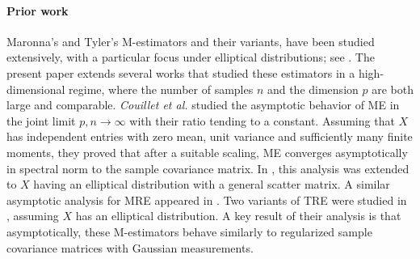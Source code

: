 \documentclass[times,sort&compress,3p]{elsarticle}
\begin{document}
\paragraph{Prior work}
Maronna's and Tyler's M-estimators and their variants, have been studied extensively, 
with a particular focus under elliptical distributions; see  \cite{wiesel2012geodesic,soloveychik2015performance,abramovich,ollila2014regularized,chen,pascal,wiesel2015structured,couillet2014robust,couillet2015random,couillet2014large,ollila2020shrinking,zhang2016marvcenko,goes2017robust,kent1988maximum,morales2015large,auguin2018large,ollila2012complex,couillet2016second}. 
The present paper extends 
several works that studied these estimators 
in a high-dimensional regime, where the number of samples $n$ and the dimension $p$ are both large and comparable. 
 {\it Couillet et al.} \cite{couillet2014robust} studied the asymptotic behavior of ME in the joint limit $p,n\to\infty$ with their ratio 
 tending to a constant. 
 Assuming that 
 $X$ has independent entries with zero mean, unit variance and sufficiently many finite moments, they proved that after a suitable scaling, ME converges asymptotically in spectral norm to the sample covariance matrix. 
In \cite{couillet2015random}, this analysis was extended to $X$ having an elliptical distribution with a general scatter matrix.  A similar asymptotic analysis for MRE
appeared in \cite{auguin2018large}.
% 
Two variants of TRE were studied in \cite{couillet2014large}, assuming $X$ has an elliptical distribution. A key result of their analysis is that asymptotically, these M-estimators behave similarly to regularized sample covariance matrices with Gaussian measurements. %
\end{document}
